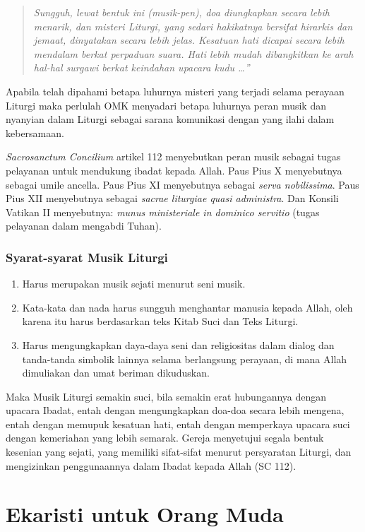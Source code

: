 \begin{quote}
\emph{Sungguh, lewat bentuk  ini (musik-pen), doa diungkapkan secara lebih menarik, dan misteri Liturgi, yang sedari hakikatnya bersifat hirarkis dan jemaat, dinyatakan secara lebih jelas. Kesatuan hati dicapai secara lebih mendalam berkat perpaduan suara. Hati lebih mudah dibangkitkan ke arah hal-hal surgawi berkat keindahan upacara kudu \ldots”}
\end{quote}

Apabila telah dipahami betapa luhurnya misteri yang terjadi selama perayaan Liturgi maka perlulah OMK menyadari betapa luhurnya peran musik dan nyanyian dalam Liturgi sebagai sarana komunikasi dengan yang ilahi dalam kebersamaan.

\textit{Sacrosanctum Concilium} artikel 112 menyebutkan peran musik sebagai tugas pelayanan untuk mendukung ibadat kepada Allah. Paus Pius X menyebutnya sebagai umile ancella. Paus Pius XI menyebutnya sebagai \textit{serva nobilissima}. Paus Pius XII menyebutnya sebagai \textit{sacrae liturgiae quasi administra}. Dan Konsili Vatikan II menyebutnya: \textit{munus ministeriale in dominico servitio} (tugas pelayanan dalam mengabdi Tuhan).

\subsubsection*{Syarat-syarat Musik Liturgi}
\begin{enumerate}
\item    Harus merupakan musik sejati menurut seni musik.
\item    Kata-kata dan nada harus sungguh menghantar manusia kepada Allah, oleh karena itu harus berdasarkan teks Kitab Suci dan Teks Liturgi.
\item    Harus mengungkapkan daya-daya seni dan religiositas dalam dialog dan tanda-tanda simbolik lainnya selama berlangsung perayaan, di mana Allah dimuliakan dan umat beriman dikuduskan.
\end{enumerate}

Maka Musik Liturgi semakin suci, bila semakin erat hubungannya dengan upacara Ibadat, entah dengan mengungkapkan doa-doa secara lebih mengena, entah dengan memupuk kesatuan hati, entah dengan memperkaya upacara suci dengan kemeriahan yang lebih semarak. Gereja menyetujui segala bentuk kesenian yang sejati, yang memiliki sifat-sifat menurut persyaratan Liturgi, dan mengizinkan penggunaannya dalam Ibadat kepada Allah (SC 112).

\section*{Ekaristi untuk Orang Muda}

